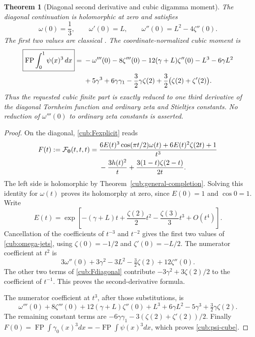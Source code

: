 \documentclass[11pt,a4paper]{article}
\newtheorem{theorem}{Theorem}[section]
\theoremstyle{definition}
\theoremstyle{remark}
\DeclareMathOperator*{\FP}{FP}
\numberwithin{equation}{section}
\begin{document}
\begin{theorem}[Diagonal second derivative and cubic digamma moment]
\label{cub:diagonal}
The diagonal continuation is holomorphic at zero and satisfies
\begin{equation}\label{cub:omega-jets}
 \omega(0)=\frac13,\qquad \omega'(0)=L,
 \qquad \boxed{\omega''(0)=L^2-4\zeta''(0)}.
\end{equation}
The first two values are classical \cite{BorweinDilcher}.
The coordinate-normalized cubic moment is
\begin{align}
 \boxed{\displaystyle\FP\int_0^1\psi(x)^3\,dx}
 ={}&-\omega'''(0)-8\zeta'''(0)
       -12(\gamma+L)\zeta''(0)-L^3-6\gamma L^2
       \notag\\
 &+5\gamma^3+6\gamma\gamma_1
       -\frac32\gamma\zeta(2)
       +\frac32\bigl(\zeta(2)+\zeta'(2)\bigr).
 \label{cub:psi-cube}
\end{align}
Thus the requested cubic finite part is exactly reduced to one third
derivative of the diagonal Tornheim function and ordinary zeta and
Stieltjes constants.  No reduction of $\omega'''(0)$ to ordinary zeta
constants is asserted.
\end{theorem}

\begin{proof}
On the diagonal, \eqref{cub:Fexplicit} reads
\begin{align}
 F(t):=\mathcal F_{\boldsymbol0}(t,t,t)
 ={}&\frac{6E(t)^3\cos(\pi t/2)\omega(t)
              +6E(t)^2\zeta(2t)+1}{t^3}
       \notag\\
 &-\frac{3h(t)^2}{t}
       +\frac{3(1-t)\zeta(2-t)}{2t}.
 \label{cub:Fdiagonal}
\end{align}
The left side is holomorphic by
Theorem~\ref{cub:general-completion}.  Solving this identity for
$\omega(t)$ proves its holomorphy at zero, since $E(0)=1$ and
$\cos0=1$.  Write
\[
 E(t)=\exp\left[-(\gamma+L)t+
                 \frac{\zeta(2)}2t^2-\frac{\zeta(3)}3t^3+O(t^4)\right].
\]
Cancellation of the coefficients of $t^{-3}$ and $t^{-2}$ gives the
first two values of \eqref{cub:omega-jets}, using
$\zeta(0)=-1/2$ and $\zeta'(0)=-L/2$.
The numerator coefficient at $t^2$ is
\[
 3\omega''(0)+3\gamma^2-3L^2-\tfrac32\zeta(2)+12\zeta''(0).
\]
The other two terms of \eqref{cub:Fdiagonal} contribute
$-3\gamma^2+3\zeta(2)/2$ to the coefficient of $t^{-1}$.
This proves the second-derivative formula.

The numerator coefficient at $t^3$, after those substitutions, is
\[
 \omega'''(0)+8\zeta'''(0)+12(\gamma+L)\zeta''(0)
 +L^3+6\gamma L^2-5\gamma^3+\tfrac32\gamma\zeta(2).
\]
The remaining constant terms are
$-6\gamma\gamma_1-3(\zeta(2)+\zeta'(2))/2$.
Finally $F(0)=\FP\int\gamma_0(x)^3dx=-\FP\int\psi(x)^3dx$,
which proves \eqref{cub:psi-cube}.
\end{proof}
\end{document}
